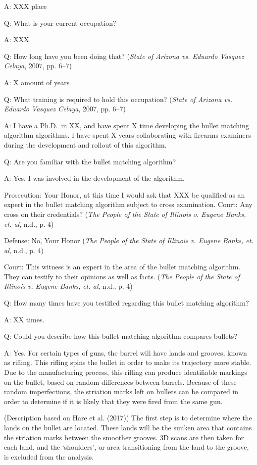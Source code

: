 \documentclass[print]{nuthesis}
\begin{document}
A: XXX place

Q: What is your current occupation?

A: XXX

Q: How long have you been doing that? (\emph{State of {Arizona} vs. Eduardo {Vasquez} {Celaya}}, 2007, pp. 6--7)

A: X amount of years

Q: What training is required to hold this occupation? (\emph{State of {Arizona} vs. Eduardo {Vasquez} {Celaya}}, 2007, pp. 6--7)

A: I have a Ph.D.~in XX, and have spent X time developing the bullet matching algorithm algorithms.
I have spent X years collaborating with firearms examiners during the development and rollout of this algorithm.

Q: Are you familiar with the bullet matching algorithm?

A: Yes. I was involved in the development of the algorithm.

Prosecution: Your Honor, at this time I would ask that XXX be qualified as an expert in the bullet matching algorithm subject to cross examination.
Court: Any cross on their credentials? (\emph{The {People} of the {State} of {Illinois} v. Eugene {Banks}, et. al}, n.d., p. 4)

Defense: No, Your Honor (\emph{The {People} of the {State} of {Illinois} v. Eugene {Banks}, et. al}, n.d., p. 4)

Court: This witness is an expert in the area of the bullet matching algorithm. They can testify to their opinions as well as facts. (\emph{The {People} of the {State} of {Illinois} v. Eugene {Banks}, et. al}, n.d., p. 4)

Q: How many times have you testified regarding this bullet matching algorithm?

A: XX times.

Q: Could you describe how this bullet matching algorithm compares bullets?

A: Yes. For certain types of guns, the barrel will have lands and grooves, known as rifling.
This rifling spins the bullet in order to make its trajectory more stable. Due to the manufacturing process, this rifling can produce identifiable markings on the bullet, based on random differences between barrels.
Because of these random imperfections, the striation marks left on bullets can be compared in order to determine if it is likely that they were fired from the same gun.

(Description based on Hare et al. (2017))
The first step is to determine where the lands on the bullet are located.
These lands will be the sunken area that contains the striation marks between the smoother grooves.
3D scans are then taken for each land, and the `shoulders', or area transitioning from the land to the groove, is excluded from the analysis.
\end{document}
